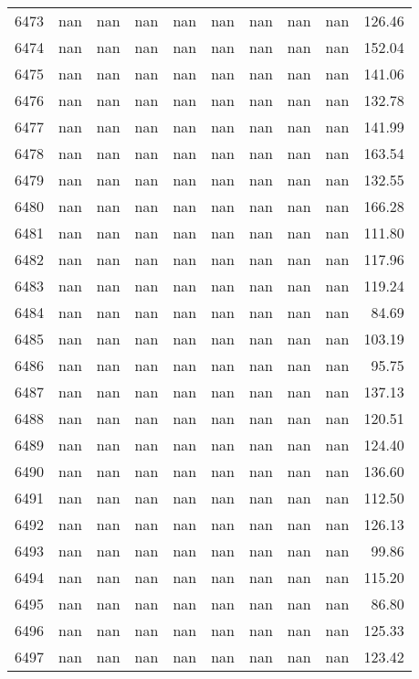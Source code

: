\begin{tabular}{lrrrrrrrrr}
6473 & nan & nan & nan & nan & nan & nan & nan & nan & 126.46 \\
6474 & nan & nan & nan & nan & nan & nan & nan & nan & 152.04 \\
6475 & nan & nan & nan & nan & nan & nan & nan & nan & 141.06 \\
6476 & nan & nan & nan & nan & nan & nan & nan & nan & 132.78 \\
6477 & nan & nan & nan & nan & nan & nan & nan & nan & 141.99 \\
6478 & nan & nan & nan & nan & nan & nan & nan & nan & 163.54 \\
6479 & nan & nan & nan & nan & nan & nan & nan & nan & 132.55 \\
6480 & nan & nan & nan & nan & nan & nan & nan & nan & 166.28 \\
6481 & nan & nan & nan & nan & nan & nan & nan & nan & 111.80 \\
6482 & nan & nan & nan & nan & nan & nan & nan & nan & 117.96 \\
6483 & nan & nan & nan & nan & nan & nan & nan & nan & 119.24 \\
6484 & nan & nan & nan & nan & nan & nan & nan & nan & 84.69 \\
6485 & nan & nan & nan & nan & nan & nan & nan & nan & 103.19 \\
6486 & nan & nan & nan & nan & nan & nan & nan & nan & 95.75 \\
6487 & nan & nan & nan & nan & nan & nan & nan & nan & 137.13 \\
6488 & nan & nan & nan & nan & nan & nan & nan & nan & 120.51 \\
6489 & nan & nan & nan & nan & nan & nan & nan & nan & 124.40 \\
6490 & nan & nan & nan & nan & nan & nan & nan & nan & 136.60 \\
6491 & nan & nan & nan & nan & nan & nan & nan & nan & 112.50 \\
6492 & nan & nan & nan & nan & nan & nan & nan & nan & 126.13 \\
6493 & nan & nan & nan & nan & nan & nan & nan & nan & 99.86 \\
6494 & nan & nan & nan & nan & nan & nan & nan & nan & 115.20 \\
6495 & nan & nan & nan & nan & nan & nan & nan & nan & 86.80 \\
6496 & nan & nan & nan & nan & nan & nan & nan & nan & 125.33 \\
6497 & nan & nan & nan & nan & nan & nan & nan & nan & 123.42 \\

\end{tabular}
